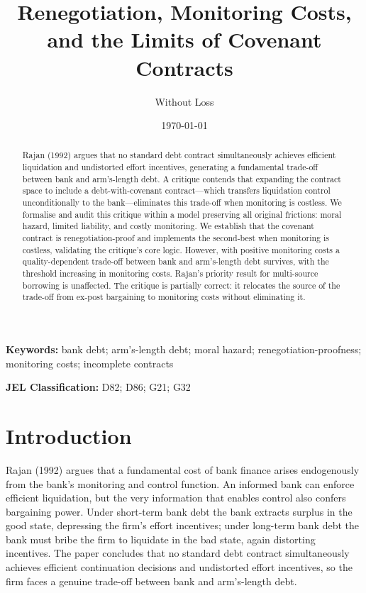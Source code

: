 \documentclass[12pt,a4paper]{article}
\title{Renegotiation, Monitoring Costs, and the Limits of Covenant Contracts}
\author{Without Loss}
\date{\today}
\theoremstyle{plain}
\theoremstyle{definition}
\theoremstyle{remark}
\begin{document}
\maketitle

\begin{abstract}
\noindent Rajan (1992) argues that no standard debt contract simultaneously achieves efficient liquidation and undistorted effort incentives, generating a fundamental trade-off between bank and arm's-length debt. A critique contends that expanding the contract space to include a debt-with-covenant contract---which transfers liquidation control unconditionally to the bank---eliminates this trade-off when monitoring is costless. We formalise and audit this critique within a model preserving all original frictions: moral hazard, limited liability, and costly monitoring. We establish that the covenant contract is renegotiation-proof and implements the second-best when monitoring is costless, validating the critique's core logic. However, with positive monitoring costs a quality-dependent trade-off between bank and arm's-length debt survives, with the threshold increasing in monitoring costs. Rajan's priority result for multi-source borrowing is unaffected. The critique is partially correct: it relocates the source of the trade-off from ex-post bargaining to monitoring costs without eliminating it.
\end{abstract}

\medskip
\noindent \textbf{Keywords:} bank debt; arm's-length debt; moral hazard; renegotiation-proofness; monitoring costs; incomplete contracts

\smallskip
\noindent \textbf{JEL Classification:} D82; D86; G21; G32

\bigskip

\section{Introduction}
\label{sec:intro}

Rajan (1992) argues that a fundamental cost of bank finance arises endogenously from the bank's monitoring and control function. An informed bank can enforce efficient liquidation, but the very information that enables control also confers bargaining power. Under short-term bank debt the bank extracts surplus in the good state, depressing the firm's effort incentives; under long-term bank debt the bank must bribe the firm to liquidate in the bad state, again distorting incentives. The paper concludes that no standard debt contract simultaneously achieves efficient continuation decisions and undistorted effort incentives, so the firm faces a genuine trade-off between bank and arm's-length debt.
\end{document}
